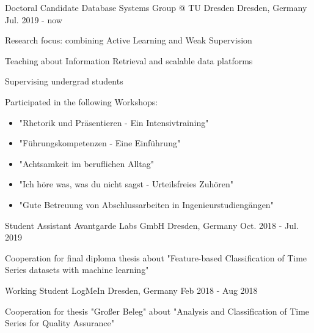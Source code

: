 \begin{cventries}



	\cventry
	{Doctoral Candidate}
	{Database Systems Group @ TU Dresden}
	{Dresden, Germany}
	{Jul. 2019 - now}
	{
		\begin{cvitems}
			\item{Research focus: combining Active Learning and Weak Supervision}
			\item{Teaching about Information Retrieval and scalable data platforms}
			\item{Supervising undergrad students}
			\item{Participated in the following Workshops:
			            \begin{itemize}
				            \item "Rhetorik und Präsentieren - Ein Intensivtraining"
				            \item "Führungskompetenzen - Eine Einführung"
				            \item "Achtsamkeit im beruflichen Alltag"
				            \item "Ich höre was, was du nicht sagst - Urteilsfreies Zuhören"
				            \item "Gute Betreuung von Abschlussarbeiten in Ingenieurstudiengängen"
			            \end{itemize}
			      }
		\end{cvitems}
	}


	\cventry
	{Student Assistant}
	{Avantgarde Labs GmbH}
	{Dresden, Germany}
	{Oct. 2018 - Jul. 2019}
	{
		\begin{cvitems}
			\item{Cooperation for final diploma thesis about "Feature-based Classification of Time Series datasets with machine learning"}
		\end{cvitems}
	}
	\cventry
	{Working Student} %
	{LogMeIn} %
	{Dresden, Germany} %
	{Feb 2018 - Aug 2018} %
	{
		\begin{cvitems} %
			\item {Cooperation for thesis "Großer Beleg" about "Analysis and Classification of Time Series for Quality Assurance"}
		\end{cvitems}
	}


\end{cventries}
